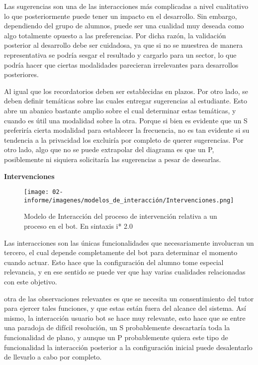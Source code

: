     \par Las sugerencias son una de las interacciones más complicadas a nivel cualitativo lo que posteriormente puede tener un impacto en el desarrollo. Sin embargo, dependiendo del grupo de alumnos, puede ser una cualidad muy deseada como algo totalmente opuesto a las preferencias. Por dicha razón, la validación posterior al desarrollo debe ser cuidadosa, ya que si no se muestrea de manera representativa se podría sesgar el resultado y cargarlo para un sector, lo que podría hacer que ciertas modalidades parecieran irrelevantes para desarrollos posteriores.
    \par Al igual que los recordatorios deben ser establecidas en plazos. Por otro lado, se deben definir temáticas sobre las cuales entregar sugerencias al estudiante. Esto abre un abanico bastante amplio sobre el cual determinar estas temáticas, y cuando es útil una modalidad sobre la otra. Porque si bien es evidente que un \acrshort{S} preferiría cierta modalidad para establecer la frecuencia, no es tan evidente si su tendencia a la privacidad los excluiría por completo de querer sugerencias. Por otro lado, algo que no se puede extrapolar del diagrama es que un \acrshort{P}, posiblemente ni siquiera solicitaría las sugerencias a pesar de desearlas.
    
    \newpage
    \textbf{Intervenciones}
    \begin{figure}[h!]
        \centering
        \texttt{[image: 02-informe/imagenes/modelos\_de\_interacción/Intervenciones.png]}
        \caption{Modelo de Interacción del proceso de intervención relativa a un proceso en el bot. En sintaxis i* 2.0}
        \label{fig:intervenciones}
    \end{figure}
    
    \par Las interacciones son las únicas funcionalidades que necesariamente involucran un tercero, el cual depende completamente del bot para determinar el momento cuando actuar.
    Esto hace que la configuración del alumno tome especial relevancia, y en ese sentido se puede ver que hay varias cualidades relacionadas con este objetivo.
    \par otra de las observaciones relevantes es que se necesita un consentimiento del tutor para ejercer tales funciones, y que estas están fuera del alcance del sistema. Así mismo, la interacción usuario bot se hace muy relevante, esto hace que se entre una paradoja de difícil resolución, un \acrshort{S} probablemente descartaría toda la funcionalidad de plano, y aunque un \acrshort{P} probablemente quiera este tipo de funcionalidad la interacción posterior a la configuración inicial puede desalentarlo de llevarlo a cabo por completo.
    
